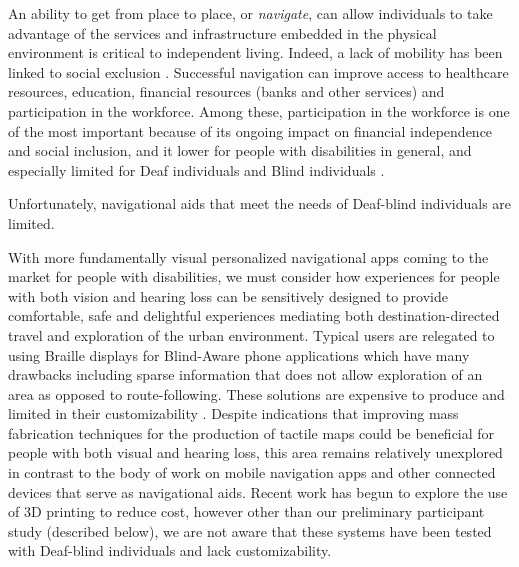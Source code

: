 

An ability to get from place to place, or \textit{navigate}, can allow individuals to take advantage of the  services and infrastructure embedded in the physical environment is critical to independent living.
Indeed, a lack of mobility has been linked to social exclusion \cite{kenyon2002transport}.
Successful navigation can improve access to healthcare resources, education, financial resources (banks and other services) and participation in the workforce.
Among these, participation in the workforce is one of the most important because of its ongoing impact on financial independence and social inclusion, and it lower for people with disabilities in general, and especially limited for Deaf individuals and Blind individuals \cite{zwerling2002workforce}.

Unfortunately,  navigational aids that meet the needs of  Deaf-blind individuals are limited.

With more fundamentally visual personalized navigational apps coming to the market for people with disabilities, we must consider how experiences for people with both vision and hearing loss can be sensitively designed to provide comfortable, safe and delightful experiences mediating both destination-directed travel and exploration of the urban environment. 
Typical users are relegated to using Braille displays for Blind-Aware phone applications which have many drawbacks including sparse information that does not allow exploration of an area as opposed to route-following.
These solutions are  expensive to produce and limited in their customizability \cite{rice2005design}.
Despite indications that improving mass fabrication techniques for the production of tactile maps could be beneficial for people with both visual and hearing loss, this area remains relatively unexplored in contrast to the body of work on mobile navigation apps and other connected devices that serve as navigational aids.
Recent work has begun to explore the use of 3D printing to reduce cost, however other than our preliminary participant study (described below), we are not aware that these systems have been tested with Deaf-blind individuals and lack customizability. 

